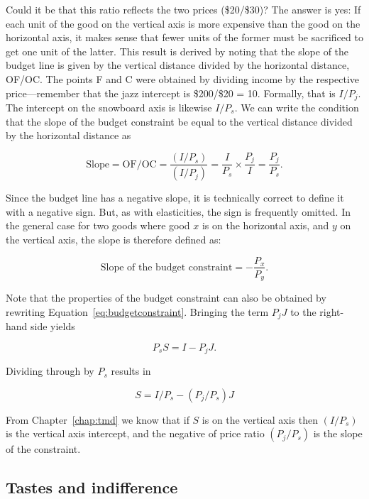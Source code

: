 Could it be that this ratio reflects the two prices (\$20/\$30)? The answer is yes: If each unit of the good on the vertical axis is more expensive than the good on the horizontal axis, it makes sense that fewer units of the former must be sacrificed to get one unit of the latter. This result is derived by noting that the slope of the budget line is given by the vertical distance divided by the horizontal distance, OF/OC. The points F and C were obtained by dividing income by the respective price---remember that the jazz intercept is \$200/\$20 = 10. Formally, that is $I/P_j$. The intercept on the snowboard axis is likewise $I/P_s$. We can write the condition that the slope of the budget constraint be equal to the vertical distance divided by the horizontal distance as

\begin{equation*}
\text{Slope}=\text{OF/OC}=\frac{(I/P_s)}{(I/P_j)}=\frac{I}{P_s}\times\frac{P_j}{I}=\frac{P_j}{P_s}.
\end{equation*}

Since the budget line has a negative slope, it is technically correct to define it with a negative sign. But, as with elasticities, the sign is frequently omitted. In the general case for two goods where good $x$ is on the horizontal axis, and $y$ on the vertical axis, the slope is therefore defined as:

\begin{equation} \label{eq:slopebudgetconstraint}
\text{Slope of the budget constraint}=-\frac{P_x}{P_y}.
\end{equation}

Note that the properties of the budget constraint can also be obtained by rewriting Equation~\ref{eq:budgetconstraint}. Bringing the term $P_jJ$ to the right-hand side yields

\begin{equation*}
P_sS=I-P_jJ.
\end{equation*}

Dividing through by $P_s$ results in

\begin{equation} \label{eq:budgetconstrainttwo}
S=I/P_s-(P_j/P_s)J
\end{equation}

From Chapter~\ref{chap:tmd} we know that if $S$ is on the vertical axis then $(I/P_s)$ is the vertical axis intercept, and the negative of price ratio $(P_j/P_s)$ is the slope of the constraint.

\subsection*{Tastes and indifference}

